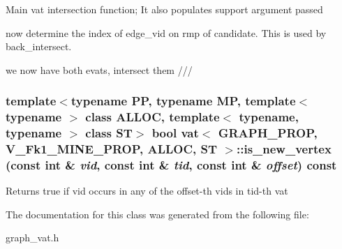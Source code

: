 Main vat intersection function; It also populates support argument passed 

now determine the index of edge\_\-vid on rmp of candidate. This is used by back\_\-intersect.

we now have both evats, intersect them /// 
\subsubsection{\setlength{\rightskip}{0pt plus 5cm}template$<$typename PP, typename MP, template$<$ typename $>$ class ALLOC, template$<$ typename, typename $>$ class ST$>$ bool \bf{vat}$<$ GRAPH\_\-PROP, V\_\-Fk1\_\-MINE\_\-PROP, ALLOC, ST $>$::is\_\-new\_\-vertex (const int \& {\em vid}, const int \& {\em tid}, const int \& {\em offset}) const\hspace{0.3cm}{\tt  [inline]}}\label{classvat_3_01GRAPH__PROP_00_01V__Fk1__MINE__PROP_00_01ALLOC_00_01ST_01_4_18c4caa2a2d7fa6f171367a35c9ebe52}


Returns true if vid occurs in any of the offset-th vids in tid-th vat 

The documentation for this class was generated from the following file:\begin{CompactItemize}
\item 
graph\_\-vat.h\end{CompactItemize}
